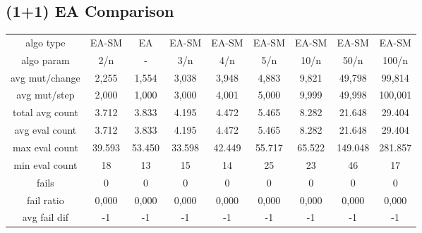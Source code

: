 \subsection{(1+1) EA Comparison}

\begin{tabular}[h]{ccccccccc}
algo type&          EA-SM&      EA&   EA-SM&   EA-SM&   EA-SM&   EA-SM&   EA-SM&   EA-SM\\
algo param&           2/n&       -&     3/n&     4/n&     5/n&    10/n&    50/n&   100/n\\
avg mut/change&     2,255&   1,554&   3,038&   3,948&   4,883&   9,821&  49,798&  99,814\\
avg mut/step&       2,000&   1,000&   3,000&   4,001&   5,000&   9,999&  49,998& 100,001\\
\hline
total avg count&    3.712&   3.833&   4.195&   4.472&   5.465&   8.282&  21.648&  29.404\\
avg eval count&     3.712&   3.833&   4.195&   4.472&   5.465&   8.282&  21.648&  29.404\\
max eval count&    39.593&  53.450&  33.598&  42.449&  55.717&  65.522& 149.048& 281.857\\
min eval count&        18&      13&      15&      14&      25&      23&      46&      17\\
\hline
fails&                  0&       0&       0&       0&       0&       0&       0&       0\\
fail ratio&         0,000&   0,000&   0,000&   0,000&   0,000&   0,000&   0,000&   0,000\\
avg fail dif&          -1&      -1&      -1&      -1&      -1&      -1&      -1&      -1\\
\end{tabular}

